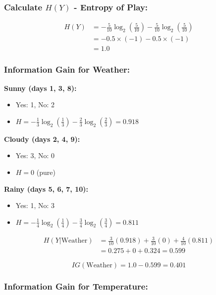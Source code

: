 \documentclass[12pt]{article}
\begin{document}
\subsubsection*{Calculate $H(Y)$ - Entropy of Play:}
\begin{align*}
H(Y) &= -\frac{5}{10}\log_2\left(\frac{5}{10}\right) - \frac{5}{10}\log_2\left(\frac{5}{10}\right) \\
&= -0.5 \times (-1) - 0.5 \times (-1) \\
&= 1.0
\end{align*}

\subsubsection*{Information Gain for Weather:}

\textbf{Sunny (days 1, 3, 8):}
\begin{itemize}
    \item Yes: 1, No: 2
    \item $H = -\frac{1}{3}\log_2\left(\frac{1}{3}\right) - \frac{2}{3}\log_2\left(\frac{2}{3}\right) = 0.918$
\end{itemize}

\textbf{Cloudy (days 2, 4, 9):}
\begin{itemize}
    \item Yes: 3, No: 0
    \item $H = 0$ (pure)
\end{itemize}

\textbf{Rainy (days 5, 6, 7, 10):}
\begin{itemize}
    \item Yes: 1, No: 3
    \item $H = -\frac{1}{4}\log_2\left(\frac{1}{4}\right) - \frac{3}{4}\log_2\left(\frac{3}{4}\right) = 0.811$
\end{itemize}

\begin{align*}
H(Y|\text{Weather}) &= \frac{3}{10}(0.918) + \frac{3}{10}(0) + \frac{4}{10}(0.811) \\
&= 0.275 + 0 + 0.324 = 0.599
\end{align*}

\begin{equation*}
\boxed{IG(\text{Weather}) = 1.0 - 0.599 = 0.401}
\end{equation*}

\subsubsection*{Information Gain for Temperature:}
\end{document}
